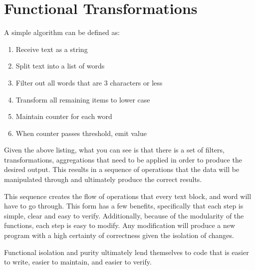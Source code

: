 \chapter{Functional Transformations}

A simple algorithm can be defined as:

\begin{enumerate}
  \item Receive text as a string
  \item Split text into a list of words
  \item Filter out all words that are 3 characters or less
  \item Transform all remaining items to lower case
  \item Maintain counter for each word 
  \item When counter passes threshold, emit value
\end{enumerate}

Given the above listing, what you can see is that there is a set of filters, transformations, aggregations that need to be applied in order to produce the desired output.  This results in a sequence of operations that the data will be manipulated through and ultimately produce the correct results.

This sequence creates the flow of operations that every text block, and word will have to go through.  This form has a few benefits, specifically that each step is simple, clear and easy to verify.  Additionally, because of the modularity of the functions, each step is easy to modify.  Any modification will produce a new program with a high certainty of correctness given the isolation of changes.  

Functional isolation and purity ultimately lend themselves to code that is easier to write, easier to maintain, and easier to verify.


